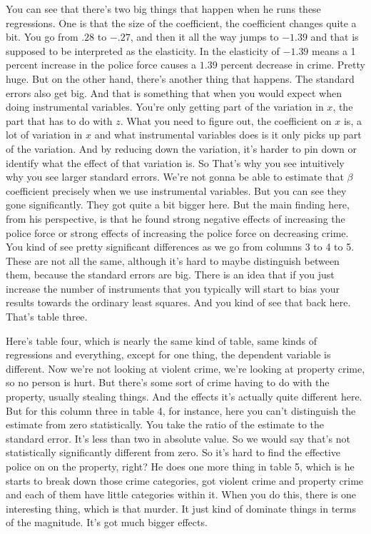 \documentclass[11pt,a4paper]{amsart}
\theoremstyle{plain}
\theoremstyle{definition}
\begin{document}
 		   You can see that there's two big things that happen when he runs these regressions. One is that the size of the coefficient, the coefficient changes quite a bit. You go from $.28$ to $-.27$, and then it all the way jumps to $-1.39$ and  that is supposed to be interpreted as the elasticity. In the elasticity of $-1 . 39$ means a 1 percent increase in the police force causes a  $1 . 39$ percent decrease in crime. Pretty huge. But on the other hand, there's another thing that happens. The standard errors also get big. And that is something that when you would expect when doing instrumental variables. You're only getting part of the variation in $x$, the part that has to do with $z$. What you need to figure out, the coefficient on $x$ is, a lot of variation in $x$ and what instrumental variables does is it only picks up part of the variation. And by reducing down the variation, it's harder to pin down or identify what the effect of that variation is. So That's why you see intuitively why you see larger standard errors.  We're not gonna be able to estimate that $\beta$ coefficient precisely when we use instrumental variables. But you can see they gone significantly. They got quite a bit bigger here. But the main finding here, from his perspective, is that he found strong negative effects of increasing the police force or strong effects of increasing the police force on decreasing crime. You kind of see pretty significant differences as we go from columns 3 to 4 to 5. These are not all the same, although it's hard to maybe distinguish between them, because the standard errors are big. There is an idea that if you just increase the number of instruments that you typically will start to bias your results towards the ordinary least squares. And you kind of see that back here. That's table three. \par 
	    	Here's table four, which is nearly the same kind of table, same kinds of regressions and everything, except for one thing, the dependent variable is different. Now we're not looking at violent crime, we're looking at property crime, so no person is hurt. But there's some sort of crime having to do with the property, usually stealing things. And the effects it's actually quite different here. But for this column three in table 4, for instance, here you can't distinguish the estimate from zero statistically. You take the ratio of the estimate to the standard error.  It's less than two in absolute value. So we would say that's not statistically significantly different from zero. So it's hard to find the effective police on on the property, right? He does one more thing in table 5, which is he starts to break down those crime categories, got violent crime and property crime and each of them have little categories within it. When you do this, there is one interesting thing, which is that murder. It just kind of dominate things in terms of the magnitude. It's got much bigger effects. \par 
\end{document}
